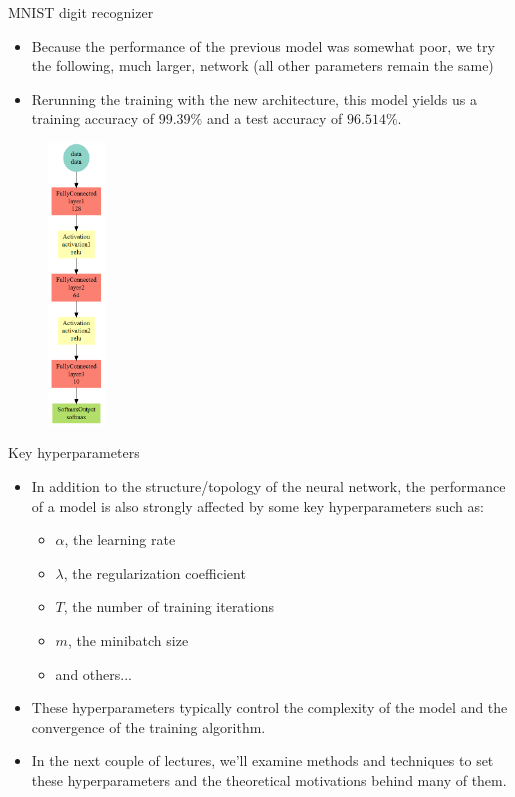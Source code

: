 \begin{vbframe}{MNIST digit recognizer}
\framebreak
  \begin{minipage}{0.45\textwidth}
    \begin{itemize}
      \item Because the performance of the previous model was somewhat poor, we try the following, much larger, network (all other parameters remain the same)
      \item Rerunning the training with the new architecture, this model yields us a training accuracy of $99.39\%$ and a test accuracy of $96.514\%$.
    \end{itemize}
  \end{minipage}
  \begin{minipage}{0.45\textwidth}
    \begin{figure}
      \centering
        \includegraphics[width=1.5cm]{plots/mxnet_codechunk_10.png}
    \end{figure}
  \end{minipage}
\end{vbframe}

\begin{frame} {Key hyperparameters}
  \begin{itemize}
    \item In addition to the structure/topology of the neural network, the performance of a model is also strongly affected by some key hyperparameters such as:
      \begin{itemize}
        \item $\alpha$, the learning rate
        \item $\lambda$, the regularization coefficient
        \item $T$, the number of training iterations
        \item $m$, the minibatch size
        \item and others...
      \end{itemize}
    \item These hyperparameters typically control the complexity of the model and the convergence of the training algorithm.
    \item In the next couple of lectures, we'll examine methods and techniques to set these hyperparameters and the theoretical motivations behind many of them.
  \end{itemize}
\end{frame}

